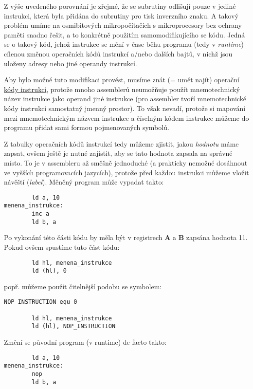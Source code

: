 \documentclass{article}
\begin{document}
Z výše uvedeného porovnání je zřejmé, že se subrutiny odlišují pouze v
jediné instrukci, která byla přidána do subrutiny pro tisk inverzního
znaku. A takový problém umíme na osmibitových mikropočítačích s
mikroprocesory bez ochrany paměti snadno řešit, a to konkrétně použitím
samomodifikujícího se kódu. Jedná se o takový kód, jehož instrukce se
mění v čase běhu programu (tedy v \emph{runtime}) cílenou změnou
operačních kódů instrukcí a/nebo dalších bajtů, v nichž jsou uloženy
adresy nebo jiné operandy instrukcí.

Aby bylo možné tuto modifikaci provést, musíme znát (= umět najít)
\href{https://clrhome.org/table/}{operační kódy instrukcí}, protože
mnoho assemblerů neumožňuje použít mnemotechnický název instrukce jako
operand jiné instrukce (pro assembler tvoří mnemotechnické kódy
instrukcí samostatný jmenný prostor). To však nevadí, protože si
mapování mezi mnemotechnickým názvem instrukce a číselným kódem
instrukce můžeme do programu přidat sami formou pojmenovaných symbolů.

Z tabulky operačních kódů instrukcí tedy můžeme zjistit, jakou
\emph{hodnotu} máme zapsat, ovšem ještě je nutné zajistit, aby se tato
hodnota zapsala na správné místo. To je v assembleru až směšně
jednoduché (a prakticky nemožné dosáhnout ve vyšších programovacích
jazycích), protože před každou instrukci můžeme vložit návěští
(\emph{label}). Měněný program může vypadat takto:

\begin{verbatim}
        ld a, 10
menena_instrukce:
        inc a
        ld b, a
\end{verbatim}

Po vykonání této části kódu by měla být v registrech \textbf{A} a
\textbf{B} zapsána hodnota 11. Pokud ovšem spustíme tuto část kódu:

\begin{verbatim}
        ld hl, menena_instrukce
        ld (hl), 0
\end{verbatim}

popř. můžeme použít čitelnější podobu se symbolem:

\begin{verbatim}
NOP_INSTRUCTION equ 0
 
        ld hl, menena_instrukce
        ld (hl), NOP_INSTRUCTION
\end{verbatim}

Změní se původní program (v runtime) de facto takto:

\begin{verbatim}
        ld a, 10
menena_instrukce:
        nop
        ld b, a
\end{verbatim}
\end{document}
